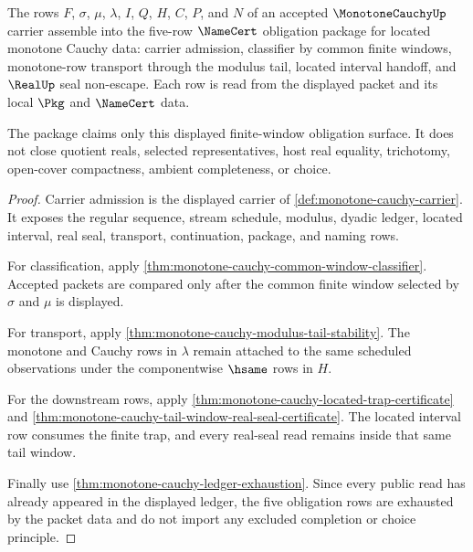 \begin{theorem}
\label{thm:monotone-cauchy-obligation-package}
The rows $F$, $\sigma$, $\mu$, $\lambda$, $I$, $Q$, $H$, $C$, $P$, and $N$ of an accepted $\MonotoneCauchyUp$ carrier assemble into the five-row $\NameCert$ obligation package for located monotone Cauchy data: carrier admission, classifier by common finite windows, monotone-row transport through the modulus tail, located interval handoff, and $\RealUp$ seal non-escape. Each row is read from the displayed packet and its local $\Pkg$ and $\NameCert$ data.

The package claims only this displayed finite-window obligation surface. It does not close quotient reals, selected representatives, host real equality, trichotomy, open-cover compactness, ambient completeness, or choice.
\end{theorem}
\begin{proof}
Carrier admission is the displayed carrier of \autoref{def:monotone-cauchy-carrier}. It exposes the regular sequence, stream schedule, modulus, dyadic ledger, located interval, real seal, transport, continuation, package, and naming rows.

For classification, apply \autoref{thm:monotone-cauchy-common-window-classifier}. Accepted packets are compared only after the common finite window selected by $\sigma$ and $\mu$ is displayed.

For transport, apply \autoref{thm:monotone-cauchy-modulus-tail-stability}. The monotone and Cauchy rows in $\lambda$ remain attached to the same scheduled observations under the componentwise $\hsame$ rows in $H$.

For the downstream rows, apply \autoref{thm:monotone-cauchy-located-trap-certificate} and \autoref{thm:monotone-cauchy-tail-window-real-seal-certificate}. The located interval row consumes the finite trap, and every real-seal read remains inside that same tail window.

Finally use \autoref{thm:monotone-cauchy-ledger-exhaustion}. Since every public read has already appeared in the displayed ledger, the five obligation rows are exhausted by the packet data and do not import any excluded completion or choice principle.
\end{proof}

